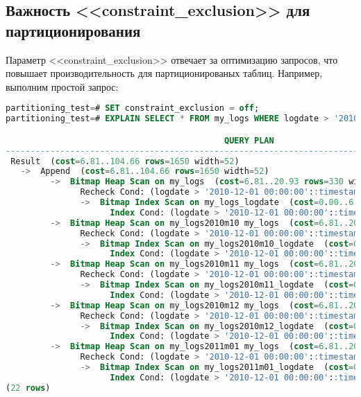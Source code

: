 \subsection{Важность <<constraint\_exclusion>> для партиционирования}
Параметр <<constraint\_exclusion>> отвечает за оптимизацию запросов, что повышает производительность для
партиционированых таблиц. Например, выполним простой запрос:
\begin{lstlisting}[language=SQL,label=lst:partitioning14,caption=<<constraint\_exclusion>> OFF]
partitioning_test=# SET constraint_exclusion = off;
partitioning_test=# EXPLAIN SELECT * FROM my_logs WHERE logdate > '2010-12-01';

                                            QUERY PLAN
---------------------------------------------------------------------------------------------------
 Result  (cost=6.81..104.66 rows=1650 width=52)
   ->  Append  (cost=6.81..104.66 rows=1650 width=52)
         ->  Bitmap Heap Scan on my_logs  (cost=6.81..20.93 rows=330 width=52)
               Recheck Cond: (logdate > '2010-12-01 00:00:00'::timestamp without time zone)
               ->  Bitmap Index Scan on my_logs_logdate  (cost=0.00..6.73 rows=330 width=0)
                     Index Cond: (logdate > '2010-12-01 00:00:00'::timestamp without time zone)
         ->  Bitmap Heap Scan on my_logs2010m10 my_logs  (cost=6.81..20.93 rows=330 width=52)
               Recheck Cond: (logdate > '2010-12-01 00:00:00'::timestamp without time zone)
               ->  Bitmap Index Scan on my_logs2010m10_logdate  (cost=0.00..6.73 rows=330 width=0)
                     Index Cond: (logdate > '2010-12-01 00:00:00'::timestamp without time zone)
         ->  Bitmap Heap Scan on my_logs2010m11 my_logs  (cost=6.81..20.93 rows=330 width=52)
               Recheck Cond: (logdate > '2010-12-01 00:00:00'::timestamp without time zone)
               ->  Bitmap Index Scan on my_logs2010m11_logdate  (cost=0.00..6.73 rows=330 width=0)
                     Index Cond: (logdate > '2010-12-01 00:00:00'::timestamp without time zone)
         ->  Bitmap Heap Scan on my_logs2010m12 my_logs  (cost=6.81..20.93 rows=330 width=52)
               Recheck Cond: (logdate > '2010-12-01 00:00:00'::timestamp without time zone)
               ->  Bitmap Index Scan on my_logs2010m12_logdate  (cost=0.00..6.73 rows=330 width=0)
                     Index Cond: (logdate > '2010-12-01 00:00:00'::timestamp without time zone)
         ->  Bitmap Heap Scan on my_logs2011m01 my_logs  (cost=6.81..20.93 rows=330 width=52)
               Recheck Cond: (logdate > '2010-12-01 00:00:00'::timestamp without time zone)
               ->  Bitmap Index Scan on my_logs2011m01_logdate  (cost=0.00..6.73 rows=330 width=0)
                     Index Cond: (logdate > '2010-12-01 00:00:00'::timestamp without time zone)
(22 rows)
\end{lstlisting}

